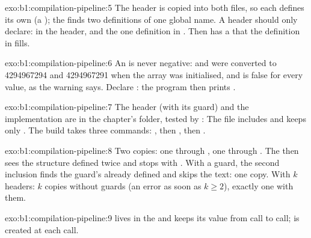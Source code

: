\begin{solution}{exo:b1:compilation-pipeline:5}
The header is copied into both files, so each  defines its own  (a  );
the  finds two definitions of one global name. A header should only declare:
 in the header, and the one definition  in
. Then  has a  that the definition in  fills.
\end{solution}

\begin{solution}{exo:b1:compilation-pipeline:6}
An  is never negative:  and  were converted to 4294967294 and 4294967291 when
the array was initialised, and  is false for every value, as the warning says. Declare
: the program then prints .
\end{solution}

\begin{solution}{exo:b1:compilation-pipeline:7}
The header (with its guard) and the implementation are in the chapter's  folder, tested by
:
The file  includes  and keeps only . The build takes three
commands: , then , then .
\end{solution}

\begin{solution}{exo:b1:compilation-pipeline:8}
Two copies: one through , one through . The  then sees the structure defined
twice and stops with . With a guard, the second inclusion finds the guard's
 already defined and skips the text: one copy. With $k$ headers: $k$ copies without guards (an error as
soon as $k \geq 2$), exactly one with them.
\end{solution}

\begin{solution}{exo:b1:compilation-pipeline:9}
 lives in the  and keeps its value from call to call;  is created at each call.
\end{solution}

